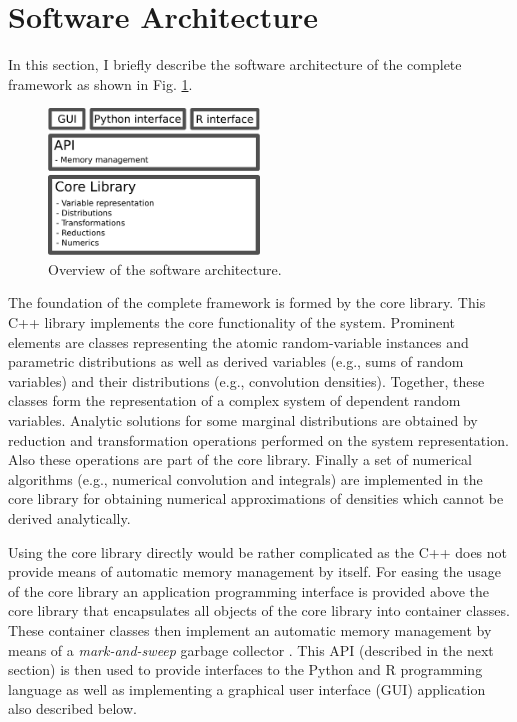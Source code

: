 \section{Software Architecture}
In this section, I briefly describe the software architecture of the complete  framework as shown in Fig. \ref{fig:arch}. 

\begin{figure} [!ht]
 \centering
 \includegraphics[width=0.5\textwidth]{fig/arch.pdf}
 \caption{Overview of the  software architecture.} \label{fig:arch}
\end{figure}

The foundation of the complete framework is formed by the  core library. This C++ library implements the core functionality of the system. Prominent elements are classes representing the atomic random-variable instances and parametric distributions as well as derived variables (e.g., sums of random variables) and their distributions (e.g., convolution densities).  Together, these classes form the representation of a complex system of dependent random variables. Analytic solutions for some marginal distributions are obtained by reduction and transformation operations performed on the system representation. Also these operations are part of the core library. Finally a set of numerical algorithms (e.g., numerical convolution and integrals) are implemented in the core library for obtaining numerical approximations of densities which cannot be derived analytically. 

Using the core library directly would be rather complicated as the C++ does not provide means of automatic memory management by itself. For easing the usage of the core library an application programming interface is provided above the core library that encapsulates all objects of the core library into container classes. These container classes then implement an automatic memory management by means of a \emph{mark-and-sweep} garbage collector \cite[e.g.,][]{Aho2007}. This API (described in the next section) is then used to provide interfaces to the Python and R programming language as well as implementing a graphical user interface (GUI) application also described below.